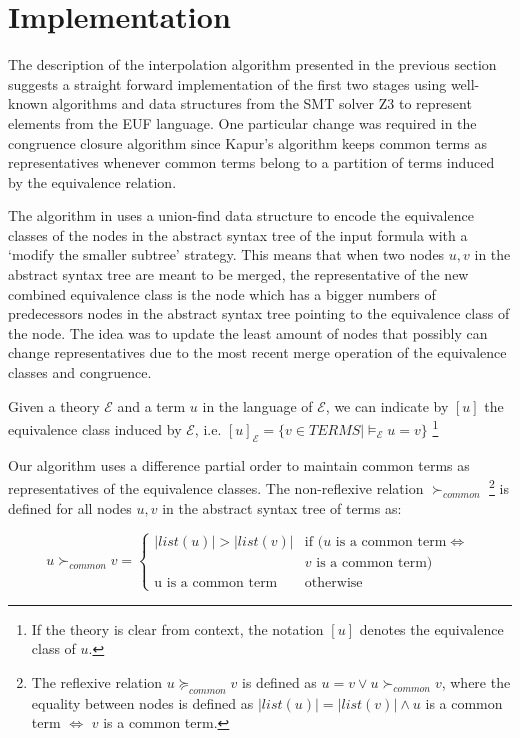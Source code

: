 \section{Implementation}

The description of the interpolation algorithm presented in the
previous section suggests a straight forward implementation
of the first two stages using well-known algorithms 
\cite{10.1145/322186.322198,10.1145/322217.322228} 
and data structures from the SMT
solver Z3 \cite{10.1007/978-3-540-78800-3_24} to represent 
elements from the EUF language. One particular change was 
required in the congruence closure algorithm since Kapur's 
algorithm keeps common terms as representatives
whenever common terms belong to a partition of terms induced
by the equivalence relation.

The algorithm in \cite{10.1145/322217.322228}
uses a union-find data structure to encode the equivalence classes
of the nodes in the abstract syntax tree of the input formula with 
a `modify the smaller subtree' strategy. This means that
when two nodes $u, v$ in the abstract syntax tree are
meant to be merged, the representative of the new 
combined equivalence class is the node which has a bigger
numbers of predecessors nodes in the abstract
syntax tree pointing to the
equivalence class of the node. The idea was to update the least
amount of nodes that possibly can change representatives
due to the most recent merge operation of the equivalence classes 
and congruence.

\begin{notation}
  Given a theory $\mathcal{E}$ and a term $u$ in the language of 
  $\mathcal{E}$, we can indicate by $[u]$ the equivalence class
  induced by $\mathcal{E}$, i.e. $[u]_{\mathcal{E}} = \{ v \in TERMS | 
  \models_{\mathcal{E}} u = v\}$ \footnote{If the theory
    is clear from context, the notation $[u]$
  denotes the equivalence class of $u$.}
\end{notation}

Our algorithm uses a difference partial order to 
maintain common terms as representatives of 
the equivalence classes. The non-reflexive relation 
$\succ_{common}$ 
\footnote{The reflexive relation $u \succeq_{common} v$
  is defined as $u = v \lor u \succ_{common} v$, where
  the equality between nodes is defined as $|list(u)| = 
  |list(v)| \land u$ is a common term $\iff$ 
  $v$ is a common term.
}
is defined for all nodes $u, v$ in the abstract syntax 
tree of terms as:

\begin{equation*}
  u \succ_{common} v = \begin{cases} 
    |list(u)| > |list(v)| & \text{if }(u \text{ is a common term}\Leftrightarrow \\ 
    & v \text{ is a common term}) \\
    \text{u is a common term} & \text{otherwise}
  \end{cases}
\end{equation*}

